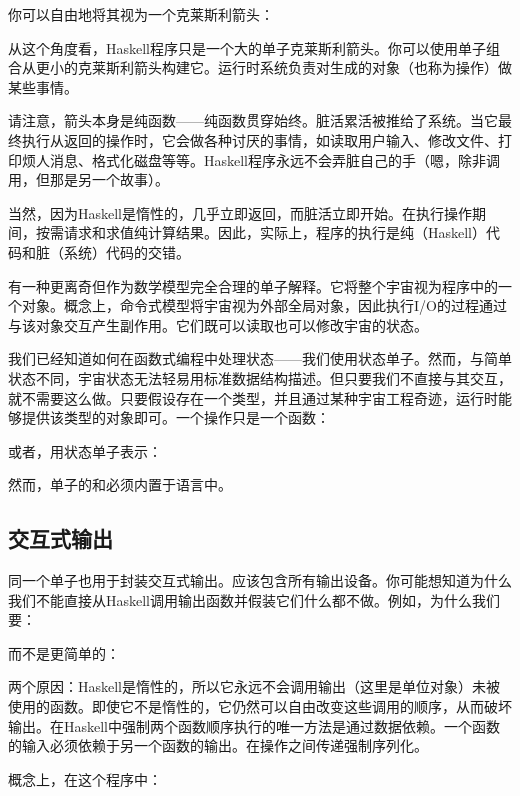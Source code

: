 你可以自由地将其视为一个克莱斯利箭头：

从这个角度看，Haskell程序只是一个大的单子克莱斯利箭头。你可以使用单子组合从更小的克莱斯利箭头构建它。运行时系统负责对生成的对象（也称为操作）做某些事情。

请注意，箭头本身是纯函数——纯函数贯穿始终。脏活累活被推给了系统。当它最终执行从返回的操作时，它会做各种讨厌的事情，如读取用户输入、修改文件、打印烦人消息、格式化磁盘等等。Haskell程序永远不会弄脏自己的手（嗯，除非调用，但那是另一个故事）。

当然，因为Haskell是惰性的，几乎立即返回，而脏活立即开始。在执行操作期间，按需请求和求值纯计算结果。因此，实际上，程序的执行是纯（Haskell）代码和脏（系统）代码的交错。

有一种更离奇但作为数学模型完全合理的单子解释。它将整个宇宙视为程序中的一个对象。概念上，命令式模型将宇宙视为外部全局对象，因此执行I/O的过程通过与该对象交互产生副作用。它们既可以读取也可以修改宇宙的状态。

我们已经知道如何在函数式编程中处理状态——我们使用状态单子。然而，与简单状态不同，宇宙状态无法轻易用标准数据结构描述。但只要我们不直接与其交互，就不需要这么做。只要假设存在一个类型，并且通过某种宇宙工程奇迹，运行时能够提供该类型的对象即可。一个操作只是一个函数：

或者，用状态单子表示：

然而，单子的\code{>=>}和必须内置于语言中。

\subsection{交互式输出}

同一个单子也用于封装交互式输出。应该包含所有输出设备。你可能想知道为什么我们不能直接从Haskell调用输出函数并假装它们什么都不做。例如，为什么我们要：

而不是更简单的：

两个原因：Haskell是惰性的，所以它永远不会调用输出（这里是单位对象）未被使用的函数。即使它不是惰性的，它仍然可以自由改变这些调用的顺序，从而破坏输出。在Haskell中强制两个函数顺序执行的唯一方法是通过数据依赖。一个函数的输入必须依赖于另一个函数的输出。在操作之间传递强制序列化。

概念上，在这个程序中：

